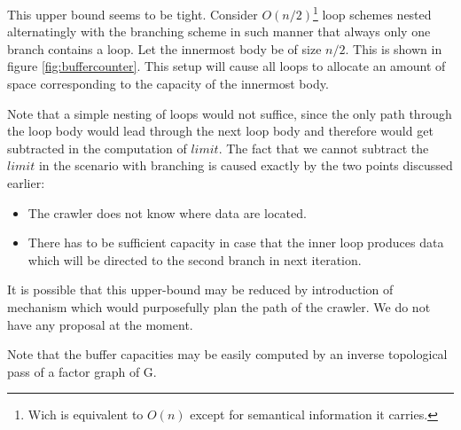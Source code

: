 This upper bound seems to be tight. Consider $O(n/2)$\footnote{Wich is equivalent to $O(n)$ except for semantical information it carries.} loop schemes nested alternatingly with the branching scheme in such manner that always only one branch contains a loop. Let the innermost body be of size $n/2$. This is shown in figure \ref{fig:buffercounter}. This setup will cause all loops to allocate an amount of space corresponding to the capacity of the innermost body.


Note that a simple nesting of loops would not suffice, since the only path through the loop body would lead through the next loop body and therefore would get subtracted in the computation of $limit$. The fact that we cannot subtract the $limit$ in the scenario with branching is caused exactly by the two points discussed earlier:
\begin{itemize}
  \item The crawler does not know where data are located.
  \item There has to be sufficient capacity in case that the inner loop produces data which will be directed to the second branch in next iteration. 
\end{itemize}

It is possible that this upper-bound may be reduced by introduction of mechanism which would purposefully plan the path of the crawler. We do not have any proposal at the moment.
  


\begin{rem}
  Note that the buffer capacities may be easily computed by an inverse topological pass of a factor graph of G. 
\end{rem}


